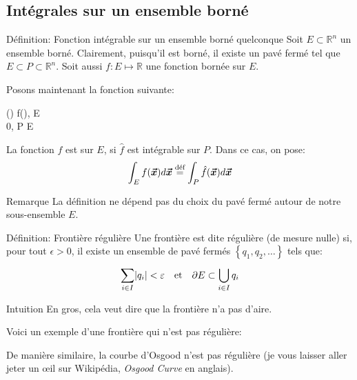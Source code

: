 \documentclass[a4paper]{article}
\begin{document}
\subsection{Intégrales sur un ensemble borné}
\begin{parag}{Définition: Fonction intégrable sur un ensemble borné quelconque}
    Soit $E \subset \mathbb{R}^n$ un ensemble borné. Clairement, puisqu'il est borné, il existe un pavé fermé tel que $E \subset P \subset\mathbb{R}^n$. Soit aussi $f :E \mapsto \mathbb{R}$ une fonction bornée sur $E$.

    Posons maintenant la fonction suivante: 
    \begin{functionbypart}{\left(\right)}
        f\left(\right), \mathspace {}  \in E \\
        0, \mathspace {}  \in P \setminus E
    \end{functionbypart}

    La fonction $f$ est  sur $E$, si $\hat{f}$ est intégrable sur $P$. Dans ce cas, on pose: 
    \[\int_{E} f\left(\bvec{x}\right) d \bvec{x} \over{=}{déf} \int_P \hat{f}\left(\bvec{x}\right)d \bvec{x}\]
    
    \begin{subparag}{Remarque}
        La définition ne dépend pas du choix du pavé fermé autour de notre sous-ensemble $E$.
    \end{subparag}
\end{parag}

\begin{parag}{Définition: Frontière régulière}
    Une frontière est dite régulière (de mesure nulle) si, pour tout $\epsilon > 0$, il existe un ensemble de pavé fermés $\left\{q_1, q_2, \ldots\right\}$ tels que: 
    \[\sum_{i \in I}^{} \left|q_i\right| < \epsilon \mathspace \text{et} \mathspace \partial E \subset \bigcup_{i \in I} q_i\]
    
    \begin{subparag}{Intuition}
        En gros, cela veut dire que la frontière n'a pas d'aire. 

        Voici un exemple d'une frontière qui n'est pas régulière:

        De manière similaire, la courbe d'Osgood n'est pas régulière (je vous laisser aller jeter un \oe{il} sur Wikipédia, \textit{Osgood Curve} en anglais).
    \end{subparag}
\end{parag}
\end{document}
